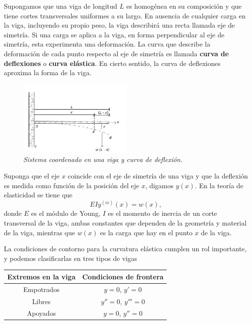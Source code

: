 \documentclass[11pt]{article}
\begin{document}
\begin{enumerate}
Supongamos que una viga de longitud $L$ es homog\'enea en su composici\'on y que tiene cortes transversales uniformes a su largo. En ausencia de cualquier carga en la viga, incluyendo su propio peso, la viga describir\'a una recta llamada eje de simetr\'ia. Si una carga se aplica a la viga, en forma perpendicular al eje de simetr\'ia, esta experimenta una deformaci\'on. La curva que describe la deformaci\'on de cada punto respecto al eje de simetr\'ia es llamada \textbf{curva de deflexiones} o \textbf{curva el\'astica}. En cierto sentido, la curva de deflexiones aproxima la forma de la viga.
     \begin{figure}[htp]
      \begin{center}
\includegraphics[width=0.5\textwidth]{./viga1.jpg}
      \caption{\sl Sistema coordenado en una viga y curva de deflexi\'on.}
      \end{center}
      \end{figure}

Suponga que el eje $x$ coincide con el eje de simetr\'ia de una viga y que la deflexi\'on es medida como funci\'on de la posici\'on del eje $x$, digamos $y(x)$. En la teor\'ia de elasticidad se tiene que
$$
EI y^{(iv)}(x)=w(x),
$$
donde $E$ es el m\'odulo de Young, $I$ es el momento de inercia de un corte transversal de la viga, ambas constantes que dependen de la geometr\'ia y material de la viga, mientras que $w(x)$ es la carga que hay en el punto $x$ de la viga.

La condiciones de contorno para la curvatura el\'astica cumplen un rol importante, y podemos clasificarlas en tres tipos de vigas

\begin{center}
\begin{tabular}{||c|c||}
\textbf{Extremos en la viga} & \textbf{Condiciones de frontera}  \\
\hline
Empotrados 	& $y=0$, $y'=0$ 	\\                                    
Libres		& $y''=0$, $y'''=0$	\\
Apoyados	& $y=0$, $y''=0$	 
\end{tabular}
\end{center}


\end{enumerate}
\end{document}

